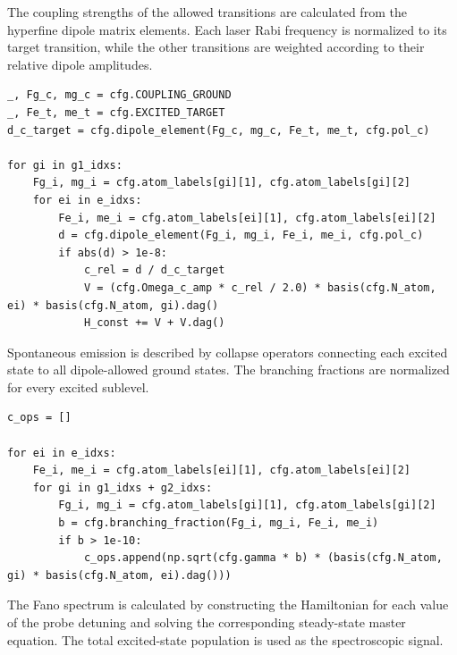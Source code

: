 \documentclass[../../thesis_main.tex]{subfiles}
\begin{document}
The coupling strengths of the allowed transitions are calculated from
the hyperfine dipole matrix elements. Each laser Rabi frequency is
normalized to its target transition, while the other transitions are
weighted according to their relative dipole amplitudes.

\begin{lstlisting}[caption={Relative laser coupling in the multilevel model.},
label={lst:multilevel_coupling}]
_, Fg_c, mg_c = cfg.COUPLING_GROUND
_, Fe_t, me_t = cfg.EXCITED_TARGET
d_c_target = cfg.dipole_element(Fg_c, mg_c, Fe_t, me_t, cfg.pol_c)

for gi in g1_idxs:
    Fg_i, mg_i = cfg.atom_labels[gi][1], cfg.atom_labels[gi][2]
    for ei in e_idxs:
        Fe_i, me_i = cfg.atom_labels[ei][1], cfg.atom_labels[ei][2]
        d = cfg.dipole_element(Fg_i, mg_i, Fe_i, me_i, cfg.pol_c)
        if abs(d) > 1e-8:
            c_rel = d / d_c_target
            V = (cfg.Omega_c_amp * c_rel / 2.0) * basis(cfg.N_atom, ei) * basis(cfg.N_atom, gi).dag()
            H_const += V + V.dag()
\end{lstlisting}

Spontaneous emission is described by collapse operators connecting
each excited state to all dipole-allowed ground states. The branching
fractions are normalized for every excited sublevel.

\begin{lstlisting}[caption={Spontaneous-emission operators in the multilevel model.},
label={lst:multilevel_decay}]
c_ops = []

for ei in e_idxs:
    Fe_i, me_i = cfg.atom_labels[ei][1], cfg.atom_labels[ei][2]
    for gi in g1_idxs + g2_idxs:
        Fg_i, mg_i = cfg.atom_labels[gi][1], cfg.atom_labels[gi][2]
        b = cfg.branching_fraction(Fg_i, mg_i, Fe_i, me_i)
        if b > 1e-10:
            c_ops.append(np.sqrt(cfg.gamma * b) * (basis(cfg.N_atom, gi) * basis(cfg.N_atom, ei).dag()))
\end{lstlisting}

The Fano spectrum is calculated by constructing the Hamiltonian for
each value of the probe detuning and solving the corresponding
steady-state master equation. The total excited-state population is
used as the spectroscopic signal.
\end{document}

